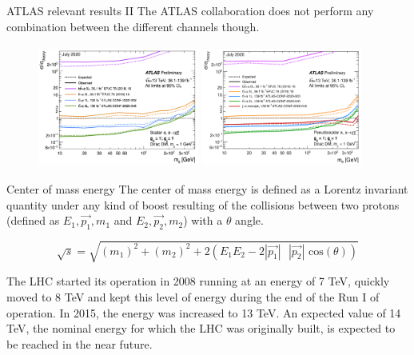 \documentclass[8pt]{beamer}
\begin{document}
\begin{frame}{ATLAS relevant results II}
\justifying
The ATLAS collaboration does not perform any combination between the different channels though. \vfill

\begin{figure}[htbp]
\centering
\begin{minipage}[b]{.5\textwidth}
\includegraphics[width=5.3cm, height=4cm]{figs/ATLASttDM_scalar.png}
\end{minipage}\hfill
\begin{minipage}[b]{.5\textwidth}
\includegraphics[width=5.3cm, height=4cm]{figs/ATLASttDM_pseudoscalar.png}
\end{minipage}\hfill
\end{figure} \vfill
\end{frame}

\begin{frame}{Center of mass energy}
\justifying
The center of mass energy is defined as a Lorentz invariant quantity under any kind of boost resulting of the collisions between two protons (defined as $E_1, \overrightarrow{p_1}, m_1$ and $E_2, \overrightarrow{p_2}, m_2$) with a $\theta$ angle. \vfill

\begin{equation*}
\sqrt{s} = \sqrt{(m_1)^2 + (m_2)^2 + 2 \left (E_1 E_2-2 |\overrightarrow{p_1}| \text{ } |\overrightarrow{p_2}| \text{ cos}(\theta) \right )}
\end{equation*} \vfill

The LHC started its operation in 2008 running at an energy of 7 TeV, quickly moved to 8 TeV
and kept this level of energy during the end of the Run I of operation. In 2015, the energy was increased to 13 TeV. \vfill
An expected value of 14 TeV, the nominal energy for which the LHC was originally built, is
expected to be reached in the near future. \vfill
\end{frame}
\end{document}
